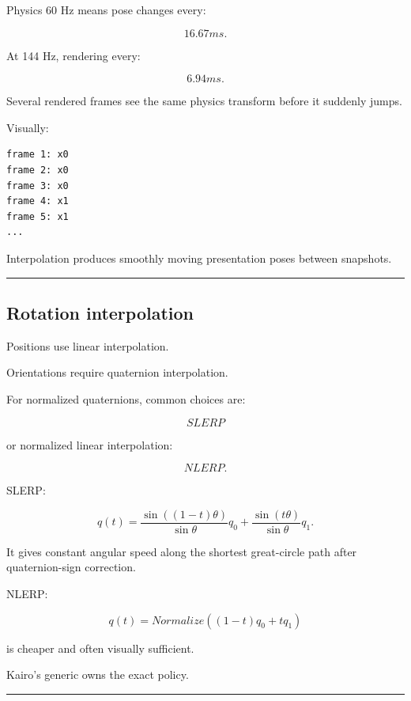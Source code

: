 Physics 60 Hz means pose changes every:

\[
16.67ms.
\]

At 144 Hz, rendering every:

\[
6.94ms.
\]

Several rendered frames see the same physics transform before it suddenly jumps.

Visually:

\begin{verbatim}
frame 1: x0
frame 2: x0
frame 3: x0
frame 4: x1
frame 5: x1
...
\end{verbatim}

Interpolation produces smoothly moving presentation poses between snapshots.

\begin{center}\rule{0.5\linewidth}{0.5pt}\end{center}

\subsection{Rotation interpolation}\label{06-engine-ii-ch037-rotation-interpolation}

\hypertarget{06-engine-ii-ch037-rotation-interpolation}{}

Positions use linear interpolation.

Orientations require quaternion interpolation.

For normalized quaternions, common choices are:

\[
SLERP
\]

or normalized linear interpolation:

\[
NLERP.
\]

SLERP:

\[
q(t)
=
\frac{
\sin((1-t)\theta)
}{
\sin\theta
}q_0
+
\frac{
\sin(t\theta)
}{
\sin\theta
}q_1.
\]

It gives constant angular speed along the shortest great-circle path after quaternion-sign correction.

NLERP:

\[
q(t)
=
Normalize(
(1-t)q_0+tq_1
)
\]

is cheaper and often visually sufficient.

Kairo's generic  owns the exact policy.

\begin{center}\rule{0.5\linewidth}{0.5pt}\end{center}

